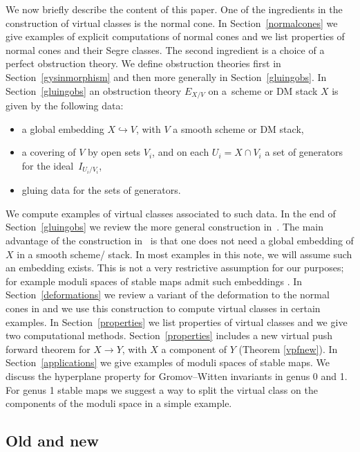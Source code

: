 \documentclass[pdftex]{sigma}
\numberwithin{equation}{section}
\begin{document}
We now briefly describe the content of this paper. One of the ingredients in the construction of virtual classes is the normal cone. In Section~\ref{normalcones} we give examples of explicit computations of normal cones and we list properties of normal cones and their Segre classes. The second ingredient is a choice of a perfect obstruction theory. We define obstruction theories first in Section~\ref{gysinmorphism} and then more generally in Section~\ref{gluingobs}. In Section~\ref{gluingobs} an obstruction theory $E_{X/V}$ on a~scheme or DM stack $X$ is given by the following data:
\begin{itemize}\itemsep=0pt
\item a global embedding $X\hookrightarrow V$, with $V$ a smooth scheme or DM stack,
\item a covering of $V$ by open sets $V_i$, and on each $U_i=X\cap V_i$ a set of generators for the ideal~$I_{U_i/V_i}$,
\item gluing data for the sets of generators.
\end{itemize}
We compute examples of virtual classes associated to such data. In the end of Section~\ref{gluingobs} we review the more general construction in~\cite{BerFan}. The main advantage of the construction in~\cite{BerFan} is that one does not need a global embedding of $X$ in a smooth scheme/ stack. In most examples in this note, we will assume such an embedding exists. This is not a very restrictive assumption for our purposes; for example moduli spaces of stable maps admit such embeddings \cite[Appendix~A]{grpa}. In Section~\ref{deformations} we review a variant of the deformation to the normal cones in \cite{KKP} and we use this construction to compute virtual classes in certain examples. In Section~\ref{properties} we list properties of virtual classes and we give two computational methods. Section~\ref{properties} includes a new virtual push forward theorem for $X\to Y$, with $X$ a component of $Y$ (Theorem \ref{vpfnew}). In Section~\ref{applications} we give examples of moduli spaces of stable maps. We discuss the hyperplane property for Gromov--Witten invariants in genus 0 and 1. For genus 1 stable maps we suggest a way to split the virtual class on the components of the moduli space in a simple example.

\subsection*{Old and new}
\end{document}
